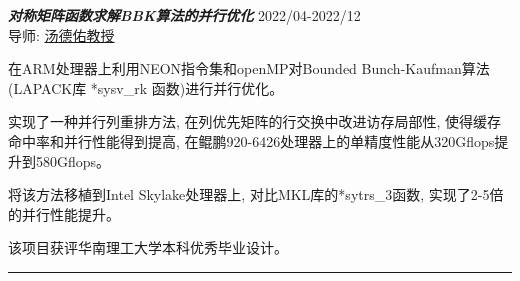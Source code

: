 \documentclass[10pt]{article}
\newenvironment{outerlist}[1][\enskip\textbullet]%
        {%
        \begin{itemize}[label=#1, itemsep=1pt]}{\end{itemize}%
         \vspace{-0.6\baselineskip}}
\newenvironment{innerlist}[1][\enskip$\circ$]%
        {\begin{compactitem}[#1]}{\end{compactitem}}
\begin{document}
\begin{outerlist}
 \item {\it \textbf{对称矩阵函数求解BBK算法的并行优化}} \hfill 2022/04-2022/12\\
 	导师: \href{http://www2.scut.edu.cn/sse/2018/0614/c16789a270678/page.htm}{汤德佑教授}
        \begin{innerlist}
                \item 在ARM处理器上利用NEON指令集和openMP对Bounded Bunch-Kaufman算法(LAPACK库 *sysv\_rk 函数)进行并行优化。
                \item 实现了一种并行列重排方法, 在列优先矩阵的行交换中改进访存局部性, 使得缓存命中率和并行性能得到提高, 在鲲鹏920-6426处理器上的单精度性能从320Gflops提升到580Gflops。
                \item 将该方法移植到Intel Skylake处理器上, 对比MKL库的*sytrs\_3函数, 实现了2-5倍的并行性能提升。
                \item 该项目获评华南理工大学本科优秀毕业设计。
        \end{innerlist}




\end{outerlist}
\noindent\rule{\textwidth}{1pt}
\end{document}
